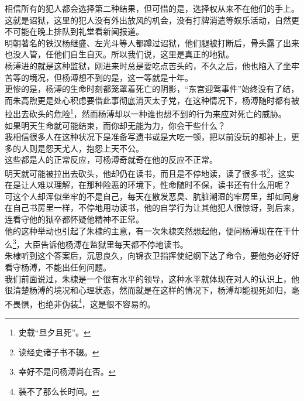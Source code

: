 \begin{multicols}{\theparacolNo}
相信所有的犯人都会选择第二种结果，但可惜的是，选择权从来不在他们的手上。\\

这就是诏狱，这里的犯人没有外出放风的机会，没有打牌消遣等娱乐活动，自然更不可能在晚上排队到礼堂看新闻报道。\\

明朝著名的铁汉杨继盛、左光斗等人都蹲过诏狱，他们腿被打断后，骨头露了出来也没人管，任他们自生自灭。所以我们说，这里是真正的地狱。\\

杨溥进的就是这种监狱，刚进来时总是要吃点苦头的，不久之后，他也陷入了坐牢苦等的境况，但杨溥想不到的是，这一等就是十年。\\

更惨的是，杨溥的生命时刻都笼罩着死亡的阴影，“东宫迎驾事件”始终没有了结，而朱高煦更是处心积虑要借此事彻底消灭太子党，在这种情况下，杨溥随时都有被拉出去砍头的危险\footnote{史载“旦夕且死”。}，然而杨溥却以一种谁也想不到的行为来应对死亡的威胁。\\

如果明天生命就可能结束，而你却无能为力，你会干些什么？\\

我相信很多人在这种状况下是准备写遗书或是大吃一顿，把以前没玩的都补上，更多的人则是怨天尤人，抱怨上天不公。\\

这些都是人的正常反应，可杨溥奇就奇在他的反应不正常。\\

明天就可能被拉出去砍头，他却仍在读书，而且是不停地读，读了很多书\footnote{读经史诸子书不辍。}，这实在是让人难以理解，在那种险恶的环境下，性命随时不保，读书还有什么用呢？\\

可这个人却浑似坐牢的不是自己，每天在散发恶臭、肮脏潮湿的牢房里，却如同身在自己书房里一样，不停地用功读书，他的自学行为让其他犯人很惊讶，到后来，连看守他的狱卒都怀疑他精神不正常。\\

他的这种举动也引起了朱棣的主意，有一次朱棣突然想起他，便问杨溥现在在干什么\footnote{幸好不是问杨溥尚在否。}，大臣告诉他杨溥在监狱里每天都不停地读书。\\

朱棣听到这个答案后，沉思良久，向锦衣卫指挥使纪纲下达了命令，要他务必好好看守杨溥，不能出任何问题。\\

我们前面说过，朱棣是一个很有水平的领导，这种水平就体现在对人的认识上，他很清楚杨溥的境况和心理状态，然而就是在这样的情况下，杨溥却能视死如归，毫不畏惧，也绝非伪装\footnote{装不了那么长时间。}，这是很不容易的。\\


\end{multicols}
